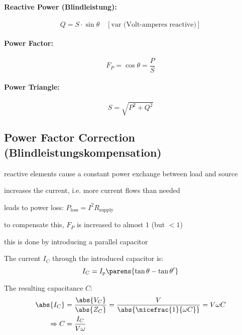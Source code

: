 		\paragraph{Reactive Power (Blindleistung):} %
			\[
				Q = S \cdot \sin\theta \quad [\text{var (Volt-amperes reactive)}]
			\]
		\paragraph{Power Factor:} %
			\[
				F_P = \cos\theta = \frac{P}{S}
			\]
		\paragraph{Power Triangle:} %
			\begin{wrapfigure}[0]{r}{.6\columnwidth}
				\vspace{-.5cm}
			\end{wrapfigure}
			\[
				S = \sqrt{P^2 + Q^2}
			\]
	\subsection{Power Factor Correction (Blindleistungskompensation)} %
		\begin{tightitemize}
			\item reactive elements cause a constant power exchange between load and source
			\item increases the current, i.e. more current flows than needed
			\item leads to power loss: $P_\text{loss} = I^2 R_\text{supply}$
			\item to compensate this, $F_P$ is increased to almost $1$ (but $< 1$)
			\item this is done by introducing a parallel capacitor
		\end{tightitemize}
		
		\begin{wrapfigure}[5]{r}{.33\columnwidth}
			\vspace{-.5cm}
		\end{wrapfigure}
		
		The current $I_C$ through the introduced capacitor is:
		\begin{equation*}
			I_C = I_p \parens{\tan \theta - \tan \theta'}
		\end{equation*}
		
		The resulting capacitance $C$:
		\begin{align*}
			\abs{I_C} &= \frac{\abs{V_C}}{\abs{Z_C}} = \frac{V}{\abs{\nicefrac{1}{\omega C}}} = V \omega C \\
			\Rightarrow C &= \frac{I_C}{V \omega}
		\end{align*}
